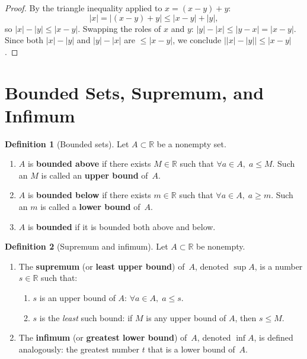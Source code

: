 \documentclass[12pt,a4paper,openany]{book}
\newcommand{\R}{\mathbb{R}}
\newcommand{\abs}[1]{\left\lvert #1 \right\rvert}
\theoremstyle{definition}
\newtheorem{definition}{Definition}[chapter]
\theoremstyle{remark}
\begin{document}
\begin{proof}
By the triangle inequality applied to $x = (x-y)+y$:
\[
  \abs{x} = \abs{(x-y)+y} \leq \abs{x-y}+\abs{y},
\]
so $\abs{x}-\abs{y} \leq \abs{x-y}$.  Swapping the roles of $x$ and $y$:
$\abs{y}-\abs{x} \leq \abs{y-x} = \abs{x-y}$.  Since both
$\abs{x}-\abs{y}$ and $\abs{y}-\abs{x}$ are $\leq \abs{x-y}$, we conclude
$\bigl|\abs{x}-\abs{y}\bigr| \leq \abs{x-y}$.
\end{proof}

\section{Bounded Sets, Supremum, and Infimum}
\label{sec:sup-inf}

\begin{definition}[Bounded sets]\label{def:bounded-set}
Let $A \subset \R$ be a nonempty set.
\begin{enumerate}[label=(\roman*)]
  \item $A$ is \textbf{bounded above} if there exists
    $M \in \R$ such that $\forall a \in A,\; a \leq M$.  Such an $M$ is
    called an \textbf{upper bound} of~$A$.
  \item $A$ is \textbf{bounded below} if there exists
    $m \in \R$ such that $\forall a \in A,\; a \geq m$.  Such an $m$ is
    called a \textbf{lower bound} of~$A$.
  \item $A$ is \textbf{bounded} if it is bounded both above
    and below.
\end{enumerate}
\end{definition}

\begin{definition}[Supremum and infimum]\label{def:sup-inf}
Let $A \subset \R$ be nonempty.
\begin{enumerate}[label=(\roman*)]
  \item The \textbf{supremum} (or \textbf{least upper bound})
    of~$A$, denoted $\sup A$, is a number $s \in \R$ such that:
    \begin{enumerate}[label=(\alph*)]
      \item $s$ is an upper bound of $A$: $\forall a \in A,\; a \leq s$.
      \item $s$ is the \emph{least} such bound: if $M$ is any upper bound
        of $A$, then $s \leq M$.
    \end{enumerate}
  \item The \textbf{infimum} (or \textbf{greatest lower
    bound}) of~$A$, denoted $\inf A$, is defined analogously: the greatest
    number $t$ that is a lower bound of~$A$.
\end{enumerate}
\end{definition}
\end{document}

